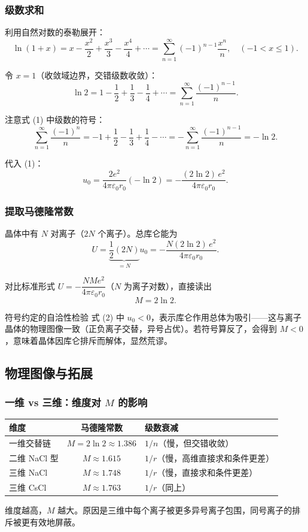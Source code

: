 \subsubsection{级数求和}

利用自然对数的泰勒展开：
\[
  \ln(1+x) = x - \frac{x^2}{2} + \frac{x^3}{3} - \frac{x^4}{4} + \cdots
            = \sum_{n=1}^{\infty} (-1)^{n-1} \frac{x^n}{n},
  \quad (-1 < x \le 1).
\]

令 $x=1$（收敛域边界，交错级数收敛）：
\[
  \ln 2 = 1 - \frac{1}{2} + \frac{1}{3} - \frac{1}{4} + \cdots
        = \sum_{n=1}^{\infty} \frac{(-1)^{n-1}}{n}.
\]

注意式 (1) 中级数的符号：
\[
  \sum_{n=1}^{\infty} \frac{(-1)^n}{n}
  = -1 + \frac{1}{2} - \frac{1}{3} + \frac{1}{4} - \cdots
  = -\sum_{n=1}^{\infty} \frac{(-1)^{n-1}}{n}
  = -\ln 2.
\]

代入 (1)：
\[
  u_0 = \frac{2e^2}{4\pi\varepsilon_0 r_0} (-\ln 2)
      = -\frac{(2\ln 2)\, e^2}{4\pi\varepsilon_0 r_0}. \tag{2}
\]

\subsubsection{提取马德隆常数}

晶体中有 $N$ 对离子（$2N$ 个离子）。总库仑能为
\[
  U = \underbrace{\frac{1}{2}(2N)}_{=N} u_0 = -\frac{N (2\ln 2)\, e^2}{4\pi\varepsilon_0 r_0}.
\]

对比标准形式 $U = -\dfrac{N M e^2}{4\pi\varepsilon_0 r_0}$（$N$ 为离子对数），直接读出
\[
  \boxed{ M = 2\ln 2 }.
\]

\begin{tipbox}{符号约定的自洽性检验}
式 (2) 中 $u_0 < 0$，表示库仑作用总体为吸引——这与离子晶体的物理图像一致（正负离子交替，异号占优）。若符号算反了，会得到 $M < 0$，意味着晶体因库仑排斥而解体，显然荒谬。
\end{tipbox}

\subsection{物理图像与拓展}

\subsubsection{一维 vs 三维：维度对 $M$ 的影响}

\begin{center}
\renewcommand{\arraystretch}{1.5}
\begin{tabular}{|l|c|l|}
\hline
\textbf{维度} & \textbf{马德隆常数} & \textbf{级数衰减} \\
\hline
一维交替链 & $M = 2\ln 2 \approx 1.386$ & $1/n$（慢，但交错收敛） \\
二维 NaCl 型 & $M \approx 1.615$ & $1/r$（慢，高维直接求和条件更差） \\
三维 NaCl & $M \approx 1.748$ & $1/r$（慢，直接求和条件更差） \\
三维 CsCl & $M \approx 1.763$ & $1/r$（同上） \\
\hline
\end{tabular}
\end{center}

维度越高，$M$ 越大。原因是三维中每个离子被更多异号离子包围，同号离子的排斥被更有效地屏蔽。


